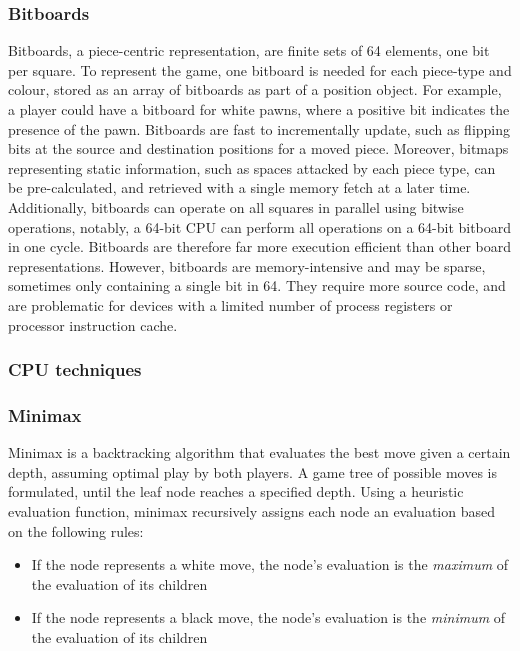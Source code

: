\documentclass[../main/main.tex]{subfiles}
\begin{document}
\subsubsection*{Bitboards}
Bitboards, a piece-centric representation, are finite sets of 64 elements, one bit per square. To represent the game, one bitboard is needed for each piece-type and colour, stored as an array of bitboards as part of a position object. For example, a player could have a bitboard for white pawns, where a positive bit indicates the presence of the pawn. Bitboards are fast to incrementally update, such as flipping bits at the source and destination positions for a moved piece. Moreover, bitmaps representing static information, such as spaces attacked by each piece type, can be pre-calculated, and retrieved with a single memory fetch at a later time. Additionally, bitboards can operate on all squares in parallel using bitwise operations, notably, a 64-bit CPU can perform all operations on a 64-bit bitboard in one cycle. Bitboards are therefore far more execution efficient than other board representations. However, bitboards are memory-intensive and may be sparse, sometimes only containing a single bit in 64. They require more source code, and are problematic for devices with a limited number of process registers or processor instruction cache.

\subsubsection{CPU techniques}
\subsubsection*{Minimax}
Minimax is a backtracking algorithm that evaluates the best move given a certain depth, assuming optimal play by both players. A game tree of possible moves is formulated, until the leaf node reaches a specified depth. Using a heuristic evaluation function, minimax recursively assigns each node an evaluation based on the following rules:

\begin{itemize}
\item If the node represents a white move, the node’s evaluation is the \textit{maximum} of the evaluation of its children
\item If the node represents a black move, the node’s evaluation is the \textit{minimum} of the evaluation of its children
\end{itemize}
\end{document}
